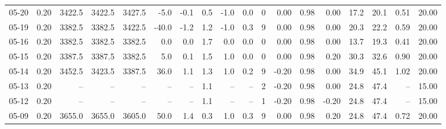 \begin{threeparttable}
{\begin{tabular}{lrrrrrrrrrrrrrrrrr}
  05-20 &     0.20 & 3422.5 & 3422.5 & 3427.5 &       -5.0 &           -0.1 &                       0.5 &                     -1.0 &                 0.0 &              0 &       0.00 &      0.98 &           0.00 &             17.2 &                20.1 &            0.51 &                  20.00 \\
  05-19 &     0.20 & 3382.5 & 3382.5 & 3422.5 &      -40.0 &           -1.2 &                       1.2 &                     -1.0 &                 0.3 &              9 &       0.00 &      0.98 &           0.00 &             20.3 &                22.2 &            0.59 &                  20.00 \\
  05-16 &     0.20 & 3382.5 & 3382.5 & 3382.5 &        0.0 &            0.0 &                       1.7 &                      0.0 &                 0.0 &              0 &       0.00 &      0.98 &           0.00 &             13.7 &                19.3 &            0.41 &                  20.00 \\
  05-15 &     0.20 & 3387.5 & 3387.5 & 3382.5 &        5.0 &            0.1 &                       1.5 &                      1.0 &                 0.0 &              0 &       0.00 &      0.98 &           0.20 &             30.3 &                32.6 &            0.90 &                  20.00 \\
  05-14 &     0.20 & 3452.5 & 3423.5 & 3387.5 &       36.0 &            1.1 &                       1.3 &                      1.0 &                 0.2 &              9 &      -0.20 &      0.98 &           0.00 &             34.9 &                45.1 &            1.02 &                  20.00 \\
  05-13 &     0.20 &     -- &     -- &     -- &         -- &             -- &                       1.1 &                       -- &                  -- &              2 &      -0.20 &      0.98 &           0.00 &             24.8 &                47.4 &              -- &                  15.00 \\
  05-12 &     0.20 &     -- &     -- &     -- &         -- &             -- &                       1.1 &                       -- &                  -- &              1 &      -0.20 &      0.98 &          -0.20 &             24.8 &                47.4 &              -- &                  15.00 \\
  05-09 &     0.20 & 3655.0 & 3655.0 & 3605.0 &       50.0 &            1.4 &                       0.3 &                      1.0 &                 0.3 &              9 &       0.00 &      0.98 &           0.20 &             24.8 &                47.4 &            0.72 &                  20.00 \\

\end{tabular}}
\end{threeparttable}
